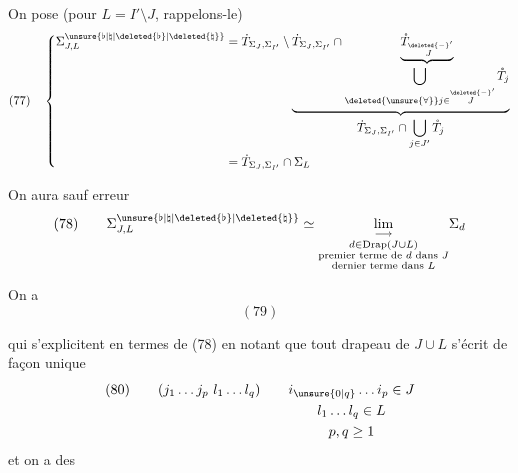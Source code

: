 On pose (pour $L=I'\setminus J$, rappelons-le)
\[
(77)\quad\left\{
\begin{aligned}
\Sigma_{J,L}^{\unsure{\flat|\natural|\deleted{\flat}|\deleted{\natural}}}&=\dot T_{\Sigma_J,\Sigma_{I'}}\setminus
\underbrace{\dot T_{\Sigma_J,\Sigma_{I'}}\cap
\underbrace{\mathring T_{\overset{\deleted{-}}{J}'}}_{\displaystyle\bigcup_{\deleted{\unsure{\forall}}j\in\overset{\deleted{-}}{J}'}\mathring T_j}}_{\displaystyle\dot T_{\Sigma_J,\Sigma_{I'}}\cap\bigcup_{j\in J'}\mathring T_j}\\
&=\dot T_{\Sigma_J,\Sigma_{I'}}\cap\Sigma_L
\end{aligned}\right.
\]

On aura sauf erreur
\[
(78)\qquad\Sigma_{J,L}^{\unsure{\flat|\natural|\deleted{\flat}|\deleted{\natural}}}\simeq
\underset{\substack{d\in\mathrm{Drap}(J\cup L)\\\text{premier terme de }d\text{ dans }J\\\text{dernier terme dans }L}}{\lim_{\longrightarrow}}\Sigma_d
\]

On a
\[
(79)
\]


qui s'explicitent en termes de (78) en notant que tout drapeau de $J\cup L$  s'écrit de façon unique
\[
(80)\qquad(j_1\ldots j_p\ l_1\ldots l_q)\qquad
\begin{gathered}[t]
i_{\unsure{0|q}}\ldots i_p\in J\\
l_1\ldots l_q\in L\\
p,q\geq1
\end{gathered}
\]
et  on a des

